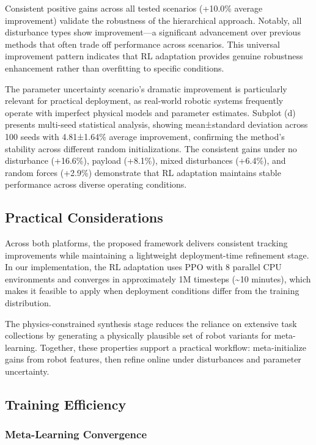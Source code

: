 \documentclass[a4paper]{cas-sc}
\begin{document}
Consistent positive gains across all tested scenarios (+10.0\% average improvement) validate the robustness of the hierarchical approach. Notably, all disturbance types show improvement—a significant advancement over previous methods that often trade off performance across scenarios. This universal improvement pattern indicates that RL adaptation provides genuine robustness enhancement rather than overfitting to specific conditions. 

The parameter uncertainty scenario's dramatic improvement is particularly relevant for practical deployment, as real-world robotic systems frequently operate with imperfect physical models and parameter estimates. Subplot (d) presents multi-seed statistical analysis, showing mean±standard deviation across 100 seeds with 4.81±1.64\% average improvement, confirming the method's stability across different random initializations. The consistent gains under no disturbance (+16.6\%), payload (+8.1\%), mixed disturbances (+6.4\%), and random forces (+2.9\%) demonstrate that RL adaptation maintains stable performance across diverse operating conditions.

\FloatBarrier
\subsection{Practical Considerations}

Across both platforms, the proposed framework delivers consistent tracking improvements while maintaining a lightweight deployment-time refinement stage. In our implementation, the RL adaptation uses PPO with 8 parallel CPU environments and converges in approximately 1M timesteps (\textasciitilde10 minutes), which makes it feasible to apply when deployment conditions differ from the training distribution.

The physics-constrained synthesis stage reduces the reliance on extensive task collections by generating a physically plausible set of robot variants for meta-learning. Together, these properties support a practical workflow: meta-initialize gains from robot features, then refine online under disturbances and parameter uncertainty.

\FloatBarrier

\subsection{Training Efficiency}

\subsubsection{Meta-Learning Convergence}
\end{document}
